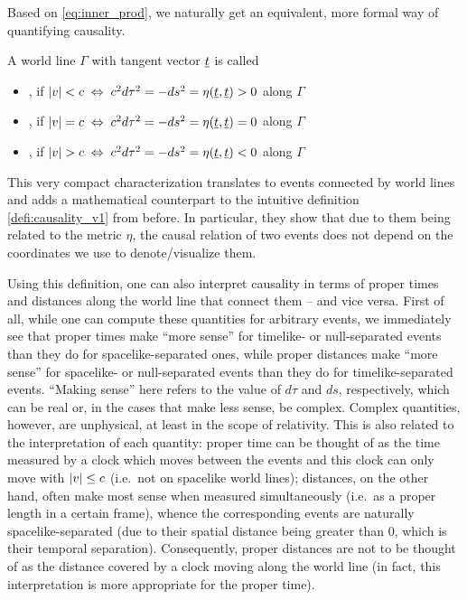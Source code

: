 \documentclass[../relativity_main.tex]{subfiles}
\begin{document}
Based on \eqref{eq:inner_prod}, we naturally get an equivalent, more formal way of quantifying causality.
\begin{defi}\label{defi:causality_v2}
	A world line $\Gamma$ with tangent vector $\underline{t}$ is called
	\begin{itemize}
		\item {}, if $\abs{v} < c \; \Leftrightarrow \; c^2 d\tau^2 = - ds^2 = \eta(\underline{t}, \underline{t}) > 0$ along $\Gamma$
		
		
		\item {}, if $\abs{v} = c \; \Leftrightarrow \; c^2 d\tau^2 = - ds^2 = \eta(\underline{t}, \underline{t}) = 0$ along $\Gamma$
		
		
		\item {}, if $\abs{v} > c \; \Leftrightarrow \; c^2 d\tau^2 = - ds^2 = \eta(\underline{t}, \underline{t}) < 0$ along $\Gamma$
	\end{itemize}
\end{defi}
This very compact characterization translates to events connected by world lines and adds a mathematical counterpart to the intuitive definition \ref{defi:causality_v1} from before. In particular, they show that due to them being related to the metric $\eta$, the causal relation of two events does not depend on the coordinates we use to denote/visualize them.

Using this definition, one can also interpret causality in terms of proper times and distances along the world line that connect them -- and vice versa. First of all, while one can compute these quantities for arbitrary events, we immediately see that proper times make \enquote{more sense} for timelike- or null-separated events than they do for spacelike-separated ones, while proper distances make \enquote{more sense} for spacelike- or null-separated events than they do for timelike-separated events. \enquote{Making sense} here refers to the value of $d\tau$ and $ds$, respectively, which can be real or, in the cases that make less sense, be complex. Complex quantities, however, are unphysical, at least in the scope of relativity. This is also related to the interpretation of each quantity: proper time can be thought of as the time measured by a clock which moves between the events and this clock can only move with $\abs{v} \leq c$ (i.e.~not on spacelike world lines); distances, on the other hand, often make most sense when measured simultaneously (i.e.~as a proper length in a certain frame), whence the corresponding events are naturally spacelike-separated (due to their spatial distance being greater than $0$, which is their temporal separation). Consequently, proper distances are not to be thought of as the distance covered by a clock moving along the world line (in fact, this interpretation is more appropriate for the proper time).
\end{document}
